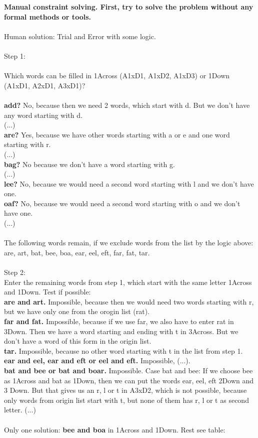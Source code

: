 \documentclass[10pt,a4paper]{article}
\begin{document}
\noindent\textbf{Manual constraint solving. First, try to solve the problem without any formal methods or tools.} 
\\ \\
Human solution: Trial and Error with some logic. \\ \\
Step 1: \\ \\
Which words can be filled in 1Across (A1xD1, A1xD2, A1xD3) or 1Down (A1xD1, A2xD1, A3xD1)? \\ \\
\textbf{add?} No, because then we need 2 words, which start with d. But we don't have any word starting with d. \\
(...) \\
\textbf{are?} Yes, because we have other words starting with a or e and one word starting with r. \\
(...)\\
\textbf{bag?} No because we don't have a word starting with g. \\
(...) \\
\textbf{lee?} No, because we would need a second word starting with l and we don't have one. \\
\textbf{oaf?} No, because we would need a second word starting with o and we don't have one. \\
(...) \\ \\

\noindent The following words remain, if we exclude words from the list by the logic above: \\ 
are, art, bat, bee, boa, ear, eel, eft, far, fat, tar. \\ \\

Step 2: \\
\noindent Enter the remaining words from step 1, which start with the same letter 1Across and 1Down. Test if possible: \\
\textbf{are and art.} Impossible, because then we would need two words starting with r, but we have only one from the orogin list (rat). \\
\textbf{far and fat.} Impossible, because if we use far, we also have to enter rat in 3Down. Then we have a word starting and ending with t in 3Across. But we don't have a word of this form in the origin list. \\
\textbf{tar.} Impossible, because no other word starting with t in the list from step 1. \\
\textbf{ear and eel, ear and eft or eel and eft.} Impossible, (...). \\
\textbf{bat and bee or bat and boar.} Impossible. Case bat and bee: If we choose bee as 1Across and bat as 1Down, then we can put the words ear, eel, eft 2Down and 3 Down. But that gives us an r, l or t in A3xD2, which is not possible, because only words from origin list start with t, but none of them has r, l or t as second letter. (...)  \\ \\
Only one solution: \textbf{bee and boa} in 1Across and 1Down. Rest see table: \\
\end{document}
